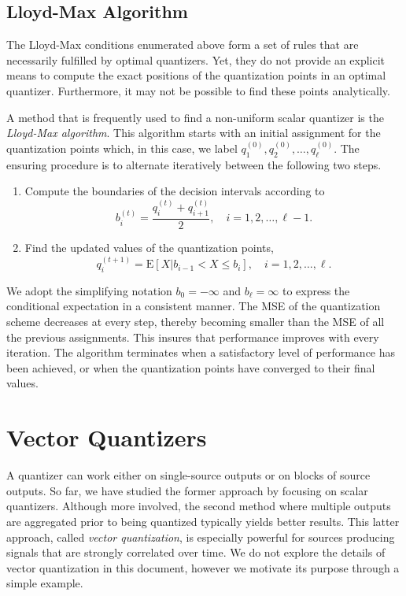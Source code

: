 \subsection{Lloyd-Max Algorithm}

The Lloyd-Max conditions enumerated above form a set of rules that are necessarily fulfilled by optimal quantizers.
Yet, they do not provide an explicit means to compute the exact positions of the quantization points in an optimal quantizer.
Furthermore, it may not be possible to find these points analytically.

A method that is frequently used to find a non-uniform scalar quantizer is the \emph{Lloyd-Max algorithm}.
This algorithm starts with an initial assignment for the quantization points which, in this case, we label $q_1^{(0)}, q_2^{(0)}, \ldots, q_{\ell}^{(0)}$.
The ensuring procedure is to alternate iteratively between the following two steps.
\begin{enumerate}
\item Compute the boundaries of the decision intervals according to
\begin{equation*}
b_i^{(t)} = \frac{q_i^{(t)} + q_{i+1}^{(t)}}{2} , \quad 
i = 1, 2, \ldots, \ell - 1 .
\end{equation*}
\item Find the updated values of the quantization points,
\begin{equation*}
q_i^{(t+1)} = \mathrm{E} [X | b_{i-1} < X \leq b_i ] , \quad
i = 1, 2, \ldots, \ell .
\end{equation*}
\end{enumerate}
We adopt the simplifying notation $b_0 = - \infty$ and $b_{\ell} = \infty$ to express the conditional expectation in a consistent manner.
The MSE of the quantization scheme decreases at every step, thereby becoming smaller than the MSE of all the previous assignments.
This insures that performance improves with every iteration.
The algorithm terminates when a satisfactory level of performance has been achieved, or when the quantization points have converged to their final values.


\section{Vector Quantizers}

A quantizer can work either on single-source outputs or on blocks of source outputs.
So far, we have studied the former approach by focusing on scalar quantizers.
Although more involved, the second method where multiple outputs are aggregated prior to being quantized typically yields better results.
This latter approach, called \emph{vector quantization}, is especially powerful for sources producing signals that are strongly correlated over time.
We do not explore the details of vector quantization in this document, however we motivate its purpose through a simple example.

